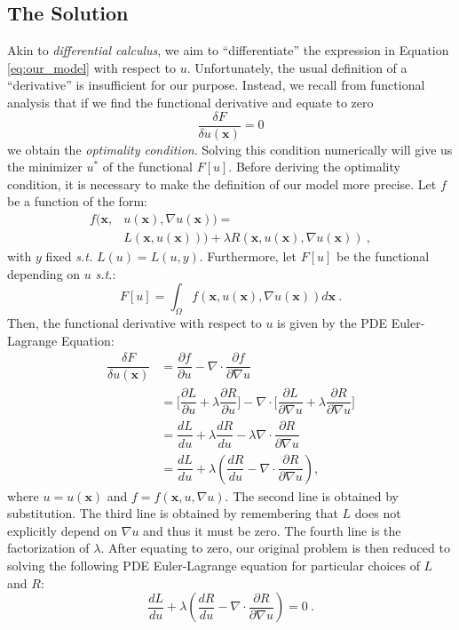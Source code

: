 \documentclass{INGUADY}
\begin{document}
\begin{body}
\subsection{The Solution}
Akin to \textit{differential calculus}, we aim to ``differentiate'' the expression in Equation \ref{eq:our_model} with respect to $u$. Unfortunately, the usual definition of a ``derivative'' is insufficient for our purpose. Instead, we recall from functional analysis that if we find the functional derivative and equate to zero
\begin{equation*}
\dfrac{\delta F}{\delta u(\mathbf{x})} = 0
\end{equation*}
we obtain the \textit{optimality condition}. Solving this condition numerically will give us the minimizer $u^*$ of the functional $F[u]$. Before deriving the optimality condition, it is necessary to make the definition of our model more precise. Let $f$ be a function of the form:
\begin{align*}
f(\mathbf{x}, &u(\mathbf{x}), \nabla u(\mathbf{x})) = \\
&L(\mathbf{x}, u(\mathbf{x}))) + \lambda R(\mathbf{x}, u(\mathbf{x}), \nabla u(\mathbf{x})) \ ,
\end{align*}
with $y$ fixed \textit{s.t.} $L(u) = L(u, y)$. Furthermore, let $F[u]$ be the functional depending on $u$ \textit{s.t.}:
\begin{equation*}
F[u] = \int_\Omega f(\mathbf{x}, u(\mathbf{x}), \nabla u(\mathbf{x})) d\mathbf{x} \ .
\end{equation*}
Then, the functional derivative with respect to $u$ is given by the PDE Euler-Lagrange Equation:
\begin{align}
\dfrac{\delta F}{\delta u(\mathbf{x})} &= \dfrac{\partial f}{\partial u} - \nabla \cdot \dfrac{\partial f}{\partial \nabla u} \label{eq:t}
\\ &= \Big[ \dfrac{\partial L}{\partial u} +  \lambda \dfrac{\partial R}{\partial u}  \Big] - \nabla \cdot \Big[   \dfrac{\partial L}{\partial \nabla u} + \lambda \dfrac{\partial R}{\partial \nabla u}   \Big]
\\ &= \dfrac{dL}{du} + \lambda \dfrac{dR}{du} - \lambda \nabla \cdot \dfrac{\partial R}{\partial \nabla u}
\\ &= \dfrac{dL}{du} + \lambda (\dfrac{dR}{du} - \nabla \cdot \dfrac{\partial R}{\partial \nabla u}),
\end{align}
where $u = u(\mathbf{x})$ and $f = f(\mathbf{x}, u, \nabla u)$. The second line is obtained by substitution. The third line is obtained by remembering that $L$ does not explicitly depend on $\nabla u$ and thus it must be zero. The fourth line is the factorization of $\lambda$. After equating to zero, our original problem is then reduced to solving the following PDE Euler-Lagrange equation for particular choices of $L$ and $R$:
\begin{equation}\label{eq:general_eq}
\dfrac{dL}{du} + \lambda (\dfrac{dR}{du} - \nabla \cdot \dfrac{\partial R}{\partial \nabla u}) = 0 \ .
\end{equation}


\end{body}
\end{document}
